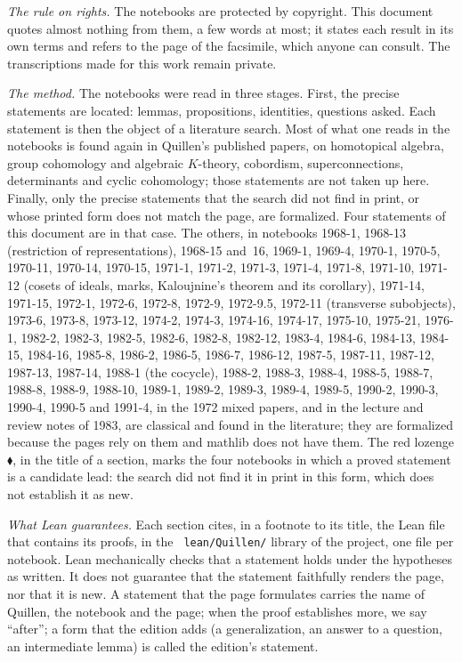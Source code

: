 \documentclass[11pt]{article}
\newcommand{\q}[1]{“#1”}
\theoremstyle{plain}
\theoremstyle{definition}
\theoremstyle{remark}
\renewcommand{\_}{\bkunderscore\allowbreak}
\let\origtexttt\texttt
\renewcommand{\texttt}[1]{\origtexttt{\XeTeXinterchartokenstate=1 #1}}
\begin{document}
\emph{The rule on rights.} The notebooks are protected by copyright. This document quotes almost nothing from them, a few words at most; it states each result in its own terms and refers to the page of the facsimile, which anyone can consult. The transcriptions made for this work remain private.

\emph{The method.} The notebooks were read in three stages. First, the precise statements are located: lemmas, propositions, identities, questions asked. Each statement is then the object of a literature search. Most of what one reads in the notebooks is found again in Quillen's published papers, on homotopical algebra, group cohomology and algebraic $K$-theory, cobordism, superconnections, determinants and cyclic cohomology; those statements are not taken up here. Finally, only the precise statements that the search did not find in print, or whose printed form does not match the page, are formalized. Four statements of this document are in that case. The others, in notebooks 1968-1, 1968-13 (restriction of representations), 1968-15 and~16, 1969-1, 1969-4, 1970-1, 1970-5, 1970-11, 1970-14, 1970-15, 1971-1, 1971-2, 1971-3, 1971-4, 1971-8, 1971-10, 1971-12 (cosets of ideals, marks, Kaloujnine's theorem and its corollary), 1971-14, 1971-15, 1972-1, 1972-6, 1972-8, 1972-9, 1972-9.5, 1972-11 (transverse subobjects), 1973-6, 1973-8, 1973-12, 1974-2, 1974-3, 1974-16, 1974-17, 1975-10, 1975-21, 1976-1, 1982-2, 1982-3, 1982-5, 1982-6, 1982-8, 1982-12, 1983-4, 1984-6, 1984-13, 1984-15, 1984-16, 1985-8, 1986-2, 1986-5, 1986-7, 1986-12, 1987-5, 1987-11, 1987-12, 1987-13, 1987-14, 1988-1 (the cocycle), 1988-2, 1988-3, 1988-4, 1988-5, 1988-7, 1988-8, 1988-9, 1988-10, 1989-1, 1989-2, 1989-3, 1989-4, 1989-5, 1990-2, 1990-3, 1990-4, 1990-5 and 1991-4, in the 1972 mixed papers, and in the lecture and review notes of 1983, are classical and found in the literature; they are formalized because the pages rely on them and mathlib does not have them. The red lozenge \textcolor{piste}{\ensuremath{\blacklozenge}}, in the title of a section, marks the four notebooks in which a proved statement is a candidate lead: the search did not find it in print in this form, which does not establish it as new.

\emph{What Lean guarantees.} Each section cites, in a footnote to its title, the Lean file that contains its proofs, in the \texttt{lean/Quillen/} library of the project, one file per notebook. Lean mechanically checks that a statement holds under the hypotheses as written. It does not guarantee that the statement faithfully renders the page, nor that it is new. A statement that the page formulates carries the name of Quillen, the notebook and the page; when the proof establishes more, we say \q{after}; a form that the edition adds (a generalization, an answer to a question, an intermediate lemma) is called the edition's statement.
\end{document}
